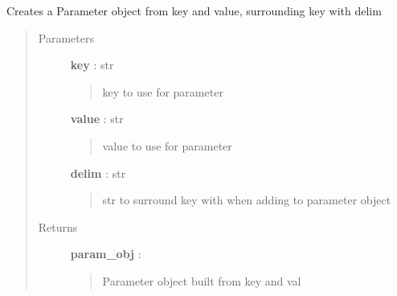 \documentclass[letterpaper,10pt,english]{sphinxmanual}
\begin{document}
\begin{fulllineitems}
\label{pytan.utils:pytan.utils.build_param_obj}
Creates a Parameter object from key and value, surrounding key with delim
\begin{quote}\begin{description}
\item[{Parameters}] \leavevmode
\textbf{key} : str
\begin{quote}

key to use for parameter
\end{quote}

\textbf{value} : str
\begin{quote}

value to use for parameter
\end{quote}

\textbf{delim} : str
\begin{quote}

str to surround key with when adding to parameter object
\end{quote}

\item[{Returns}] \leavevmode
\textbf{param\_obj} : {\hyperref[taniumpy.object_types:taniumpy.object_types.parameter.Parameter]{}}
\begin{quote}

Parameter object built from key and val
\end{quote}

\end{description}\end{quote}

\end{fulllineitems}

\end{document}
